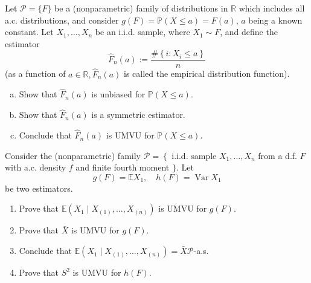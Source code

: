 \begin{exercise}
    Let \(\mathcal{P}=\{F\}\) be a (nonparametric) family of distributions in \(\mathbb{R}\) which includes all a.c. distributions, and consider \(g(F)=\mathbb{P}(X \leq a)=F(a)\), \(a\) being a known constant. Let \(X_{1}, \ldots, X_{n}\) be an i.i.d. sample, where \(X_{1} \sim F\), and define the estimator
    \[
    \widehat{F}_{n}(a):=\frac{\#\left\{i: X_{i} \leq a\right\}}{n}
    \]
    (as a function of \(a \in \mathbb{R}, \widehat{F}_{n}(a)\) is called the empirical distribution function). 
    \begin{enumerate}[(a)]
        \item Show that \(\widehat{F}_{n}(a)\) is unbiased for \(\mathbb{P}(X \leq a)\). 
        \item Show that \(\widehat{F}_{n}(a)\) is a symmetric estimator. 
        \item Conclude that \(\widehat{F}_{n}(a)\) is UMVU for \(\mathbb{P}(X \leq a)\). 
    \end{enumerate}
\end{exercise}


\begin{exercise}
    Consider the (nonparametric) family
    \(\mathcal{P}=\left\{\right.\) i.i.d. sample \(X_{1}, \ldots, X_{n}\) from a d.f. \(F\) with a.c. density \(f\) and finite fourth moment \(\} .\)
    Let
    \[
    g(F)=\mathbb{E} X_{1}, \quad h(F)=\operatorname{Var} X_{1}
    \]
    be two estimators. 
    \begin{enumerate}
        \item Prove that \(\mathbb{E}\left(X_{1} \mid X_{(1)}, \ldots, X_{(n)}\right)\) is UMVU for \(g(F)\). 
        \item Prove that \(\bar{X}\) is UMVU for \(g(F)\). 
        \item Conclude that \(\mathbb{E}\left(X_{1} \mid X_{(1)}, \ldots, X_{(n)}\right)=\bar{X} \mathcal{P}\)-a.s. 
        \item Prove that \(S^{2}\) is UMVU for \(h(F)\). 
    \end{enumerate}
\end{exercise}


